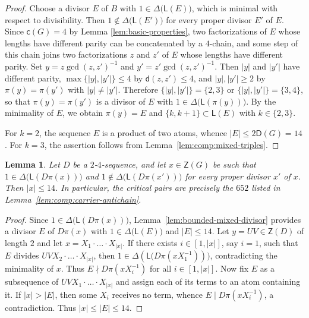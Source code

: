 \documentclass[a4paper, 10pt]{amsart}
\theoremstyle{plain}
\newtheorem{lemma}[theorem]{\bf Lemma}
\theoremstyle{definition}
\theoremstyle{definition}
\numberwithin{equation}{section}
\begin{document}
\begin{proof}
Choose a divisor $E$ of $B$ with $1 \in \Delta \big(\mathsf L (E) \big)$, which is
minimal with respect to divisibility. Then $1 \notin \Delta \big(\mathsf L (E') \big)$
for every proper divisor $E'$ of $E$.  Since $\mathsf c (G) = 4$ by Lemma \ref{lem:basic-properties}, two
factorizations of $E$ whose lengths have different parity can be concatenated
by a $4$-chain, and some step of this chain joins two factorizations $z$ and
$z'$ of $E$ whose lengths have different parity.  Set $y = z\gcd (z,z')^{-1}$
and $y' = z'\gcd (z,z')^{-1}$. Then $|y|$ and $|y'|$ have different parity,
$\max \{|y|,|y'|\} \le 4$ by $\mathsf d (z,z') \le 4$, and $|y|,|y'| \ge 2$ by $\pi(y)=\pi(y')$ with $|y|\neq |y'|$.  Therefore
$\{|y|,|y'|\} = \{2,3\}$ or $\{|y|,|y'|\} = \{3,4\}$, so that
$\pi (y) = \pi (y')$ is a divisor of $E$ with $1\in \Delta \big(\mathsf L ( \pi(y) ) \big)$.
 By the minimality of $E$, we obtain
$\pi (y) = E$ and  $\{k,k+1\} \subset \mathsf L (E)$ with $k\in \{2,3\}$.

For $k=2$, the sequence $E$ is a product of two atoms, whence
$|E| \le 2\mathsf D(G)=14$.  For $k=3$, the assertion follows from Lemma~\ref{lem:comp:mixed-triples}.
\end{proof}


\begin{lemma} \label{lem:bounded-context}
Let $D$ be a $2$-$4$-sequence, and let $x \in \mathsf Z(G)$ be such that
$1\in \Delta \big(\mathsf L(D\pi(x)) \big)$ and $1\notin \Delta \big(\mathsf L(D\pi(x')) \big)$ for every proper divisor $x'$ of $x$.  Then $|x| \le 14$.
In particular, the critical pairs are precisely the $652$ listed in
Lemma~\ref{lem:comp:carrier-antichain}.
\end{lemma}

\begin{proof}
Since $1 \in \Delta \big(\mathsf L (D\pi(x)) \big)$,
Lemma~\ref{lem:bounded-mixed-divisor} provides a divisor
$E$ of $D\pi(x)$ with $1 \in \Delta \big(\mathsf L (E) \big)$ and $|E| \le 14$.  Let
$y = UV \in \mathsf Z (D)$ of length $2$ and let $x = X_1 \cdot \ldots \cdot X_{|x|}$. If there exists $i\in [1, |x|]$, say $i=1$, such that $E$ divides $UVX_2\cdot \ldots \cdot X_{|x|}$, then 
$1 \in \Delta (\mathsf L \big(D \pi (x X_1^{-1})) \big)$, contradicting the minimality
of $x$.  Thus $E\nmid D\pi(xX_i^{-1})$ for all $i \in [1,|x|]$.  Now
fix $E$ as a subsequence of $UVX_1 \cdot \ldots \cdot X_{|x|}$ and assign each
of its terms to an atom containing it.  If $|x| > |E|$, then some $X_i$
receives no term, whence $E \mid D\pi(xX_i^{-1})$, a contradiction.  Thus
$|x|\le |E|\le 14$.
\end{proof}
\end{document}
